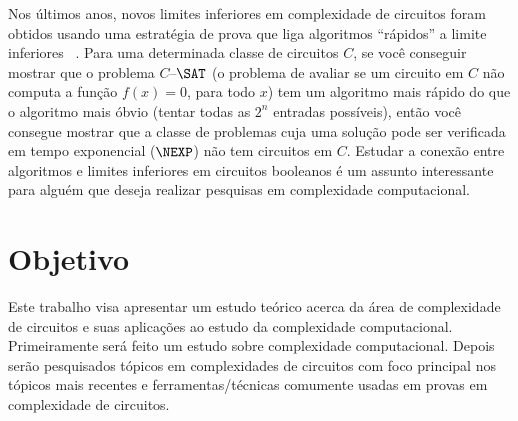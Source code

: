 Nos últimos anos, novos limites inferiores em complexidade de circuitos foram obtidos usando uma estratégia de prova que liga algoritmos ``rápidos''  a limite inferiores ~\cite{RW1, RW2}.  Para uma determinada classe de circuitos $C$, se você conseguir mostrar que o problema $C$--$\SAT$ (o problema de avaliar se um circuito em $C$ não computa a função $f(x) = 0$, para todo $x$) tem um algoritmo mais rápido do que o algoritmo mais óbvio (tentar todas as $2^n$ entradas possíveis), então você consegue mostrar que a classe de problemas cuja uma solução pode ser verificada em tempo exponencial ($\NEXP$) não tem circuitos em $C$. Estudar a conexão entre algoritmos e limites inferiores em circuitos booleanos é um assunto interessante para alguém que deseja realizar pesquisas em complexidade computacional.

\section{Objetivo}

Este trabalho visa apresentar um estudo teórico acerca da área de complexidade de circuitos e suas aplicações ao estudo da complexidade computacional. Primeiramente será feito um estudo sobre complexidade computacional. Depois serão pesquisados tópicos em complexidades de circuitos com foco principal nos tópicos mais recentes e ferramentas/técnicas comumente usadas em provas em complexidade de circuitos.
